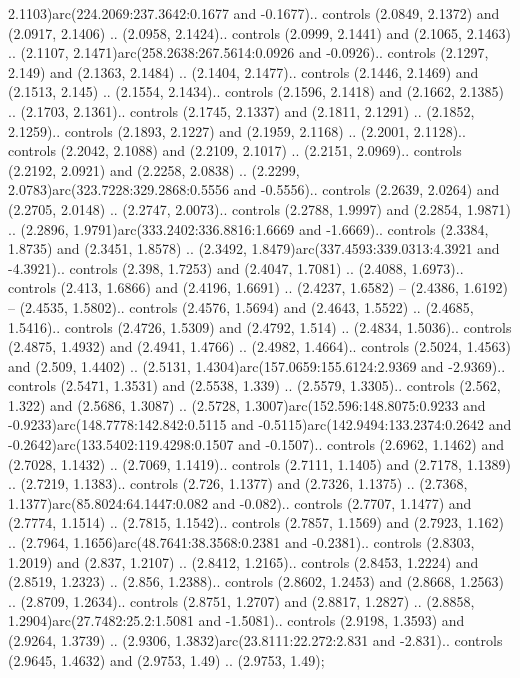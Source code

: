 2.1103)arc(224.2069:237.3642:0.1677 and -0.1677).. controls (2.0849, 2.1372) and (2.0917, 2.1406) .. (2.0958, 2.1424).. controls (2.0999, 2.1441) and (2.1065, 2.1463) .. (2.1107, 2.1471)arc(258.2638:267.5614:0.0926 and -0.0926).. controls (2.1297, 2.149) and (2.1363, 2.1484) .. (2.1404, 2.1477).. controls (2.1446, 2.1469) and (2.1513, 2.145) .. (2.1554, 2.1434).. controls (2.1596, 2.1418) and (2.1662, 2.1385) .. (2.1703, 2.1361).. controls (2.1745, 2.1337) and (2.1811, 2.1291) .. (2.1852, 2.1259).. controls (2.1893, 2.1227) and (2.1959, 2.1168) .. (2.2001, 2.1128).. controls (2.2042, 2.1088) and (2.2109, 2.1017) .. (2.2151, 2.0969).. controls (2.2192, 2.0921) and (2.2258, 2.0838) .. (2.2299, 2.0783)arc(323.7228:329.2868:0.5556 and -0.5556).. controls (2.2639, 2.0264) and (2.2705, 2.0148) .. (2.2747, 2.0073).. controls (2.2788, 1.9997) and (2.2854, 1.9871) .. (2.2896, 1.9791)arc(333.2402:336.8816:1.6669 and -1.6669).. controls (2.3384, 1.8735) and (2.3451, 1.8578) .. (2.3492, 1.8479)arc(337.4593:339.0313:4.3921 and -4.3921).. controls (2.398, 1.7253) and (2.4047, 1.7081) .. (2.4088, 1.6973).. controls (2.413, 1.6866) and (2.4196, 1.6691) .. (2.4237, 1.6582) -- (2.4386, 1.6192) -- (2.4535, 1.5802).. controls (2.4576, 1.5694) and (2.4643, 1.5522) .. (2.4685, 1.5416).. controls (2.4726, 1.5309) and (2.4792, 1.514) .. (2.4834, 1.5036).. controls (2.4875, 1.4932) and (2.4941, 1.4766) .. (2.4982, 1.4664).. controls (2.5024, 1.4563) and (2.509, 1.4402) .. (2.5131, 1.4304)arc(157.0659:155.6124:2.9369 and -2.9369).. controls (2.5471, 1.3531) and (2.5538, 1.339) .. (2.5579, 1.3305).. controls (2.562, 1.322) and (2.5686, 1.3087) .. (2.5728, 1.3007)arc(152.596:148.8075:0.9233 and -0.9233)arc(148.7778:142.842:0.5115 and -0.5115)arc(142.9494:133.2374:0.2642 and -0.2642)arc(133.5402:119.4298:0.1507 and -0.1507).. controls (2.6962, 1.1462) and (2.7028, 1.1432) .. (2.7069, 1.1419).. controls (2.7111, 1.1405) and (2.7178, 1.1389) .. (2.7219, 1.1383).. controls (2.726, 1.1377) and (2.7326, 1.1375) .. (2.7368, 1.1377)arc(85.8024:64.1447:0.082 and -0.082).. controls (2.7707, 1.1477) and (2.7774, 1.1514) .. (2.7815, 1.1542).. controls (2.7857, 1.1569) and (2.7923, 1.162) .. (2.7964, 1.1656)arc(48.7641:38.3568:0.2381 and -0.2381).. controls (2.8303, 1.2019) and (2.837, 1.2107) .. (2.8412, 1.2165).. controls (2.8453, 1.2224) and (2.8519, 1.2323) .. (2.856, 1.2388).. controls (2.8602, 1.2453) and (2.8668, 1.2563) .. (2.8709, 1.2634).. controls (2.8751, 1.2707) and (2.8817, 1.2827) .. (2.8858, 1.2904)arc(27.7482:25.2:1.5081 and -1.5081).. controls (2.9198, 1.3593) and (2.9264, 1.3739) .. (2.9306, 1.3832)arc(23.8111:22.272:2.831 and -2.831).. controls (2.9645, 1.4632) and (2.9753, 1.49) .. (2.9753, 1.49);




